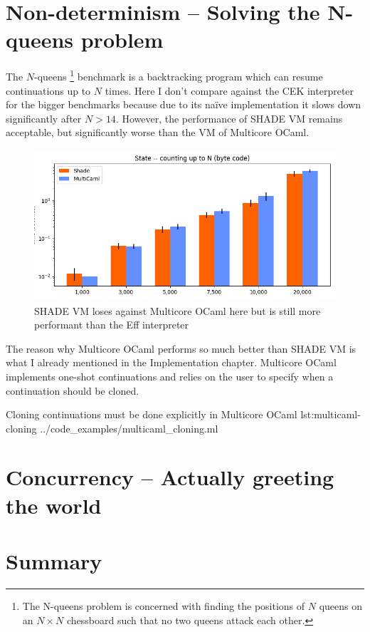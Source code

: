\documentclass[class=article, crop=false]{standalone}
\begin{document}
\section{Non-determinism -- Solving the N-queens problem}

The $N$-queens
\footnote{The N-queens problem is concerned with finding the positions of $N$ queens on an $N \times N$ chessboard
such that no two queens attack each other.}
benchmark is a backtracking program which can resume continuations up to $N$ times. Here I don't compare against the CEK interpreter
for the bigger benchmarks because due to its naïve implementation it slows down significantly after $N > 14$. However, the performance of
SHADE VM remains acceptable, but significantly worse than the VM of Multicore OCaml.

\begin{figure}
    \centering
    \includegraphics[width=35em]{eval_plots/comp_state.png}
    \caption{SHADE VM loses against Multicore OCaml here but is still more performant than the Eff interpreter}
    \label{fig:n-queens}
\end{figure}

The reason why Multicore OCaml performs so much better than SHADE VM is what I already mentioned in the Implementation chapter. Multicore OCaml
implements one-shot continuations and relies on the user to specify when a continuation should be cloned.

{Cloning continuations must be done explicitly in Multicore OCaml}
{lst:multicaml-cloning}
{../code_examples/multicaml_cloning.ml}

\section{Concurrency -- Actually greeting the world}

\section{Summary}
\end{document}

